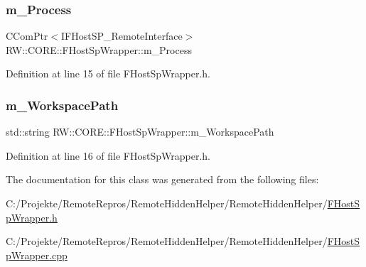 \subsubsection{\texorpdfstring{m\+\_\+\+Process}{m\_Process}}
{\footnotesize\ttfamily C\+Com\+Ptr$<$I\+F\+Host\+S\+P\+\_\+\+Remote\+Interface$>$ R\+W\+::\+C\+O\+R\+E\+::\+F\+Host\+Sp\+Wrapper\+::m\+\_\+\+Process\hspace{0.3cm}{\ttfamily [private]}}



Definition at line 15 of file F\+Host\+Sp\+Wrapper.\+h.

\hypertarget{class_r_w_1_1_c_o_r_e_1_1_f_host_sp_wrapper_a3760e496eac5633321be3f2345b86b88}{}\label{class_r_w_1_1_c_o_r_e_1_1_f_host_sp_wrapper_a3760e496eac5633321be3f2345b86b88} 
\subsubsection{\texorpdfstring{m\+\_\+\+Workspace\+Path}{m\_WorkspacePath}}
{\footnotesize\ttfamily std\+::string R\+W\+::\+C\+O\+R\+E\+::\+F\+Host\+Sp\+Wrapper\+::m\+\_\+\+Workspace\+Path\hspace{0.3cm}{\ttfamily [private]}}



Definition at line 16 of file F\+Host\+Sp\+Wrapper.\+h.



The documentation for this class was generated from the following files\+:\begin{DoxyCompactItemize}
\item 
C\+:/\+Projekte/\+Remote\+Repros/\+Remote\+Hidden\+Helper/\+Remote\+Hidden\+Helper/\hyperlink{_f_host_sp_wrapper_8h}{F\+Host\+Sp\+Wrapper.\+h}\item 
C\+:/\+Projekte/\+Remote\+Repros/\+Remote\+Hidden\+Helper/\+Remote\+Hidden\+Helper/\hyperlink{_f_host_sp_wrapper_8cpp}{F\+Host\+Sp\+Wrapper.\+cpp}\end{DoxyCompactItemize}
